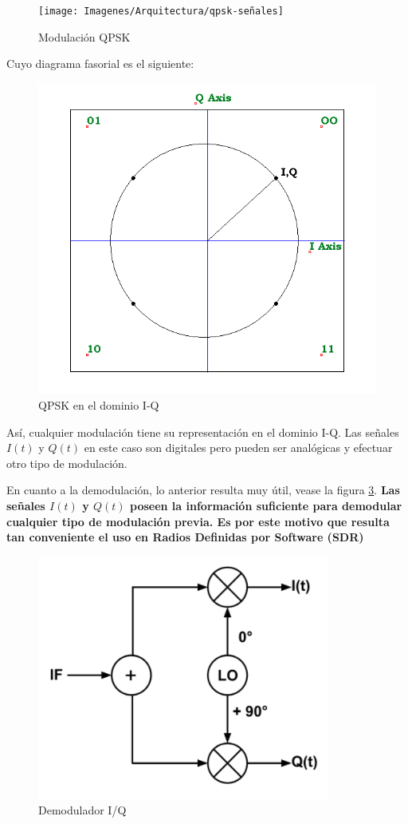 \documentclass[a4paper,12pt]{report} %
\begin{document}
\begin{figure}[H]
	\centering
	\texttt{[image: Imagenes/Arquitectura/qpsk-señales]}
	\caption{Modulación QPSK }
	\label{señalesqpsk}
\end{figure}

Cuyo diagrama fasorial es el siguiente: 

\begin{figure}[H]
	\centering
	\includegraphics[scale=0.7]{Imagenes/Arquitectura/qpsk-fasores}
	\caption{QPSK en el dominio I-Q}
	\label{fasoresqpsk}
\end{figure}

Así, cualquier modulación tiene su representación en el dominio I-Q. Las señales $I(t)$ y $Q(t)$ en este caso son digitales pero pueden ser analógicas y efectuar otro tipo de modulación.

En cuanto a la demodulación, lo anterior resulta muy útil, vease la figura \ref{iqdemo}. \textbf{Las señales $I(t)$ y $Q(t)$ poseen la información suficiente para demodular cualquier tipo de modulación previa. Es por este motivo que resulta tan conveniente el uso en Radios Definidas por Software (SDR)}

\begin{figure}[H]
	\centering
	\includegraphics[scale=0.7]{Imagenes/Arquitectura/iqdemo}
	\caption{Demodulador I/Q}
	\label{iqdemo}
\end{figure}
\end{document}
